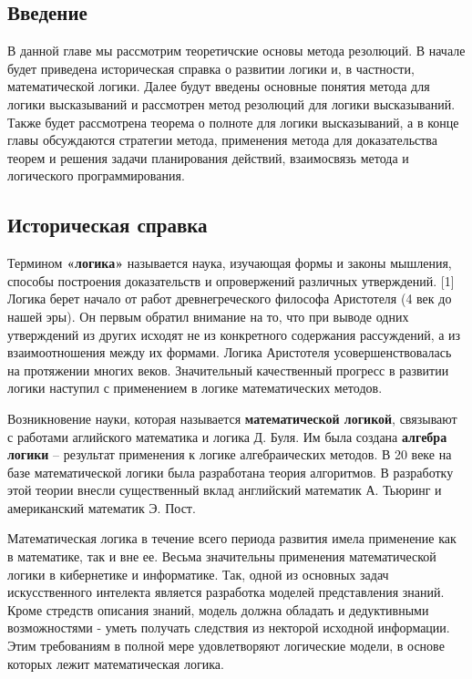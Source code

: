 \documentclass[12pt, a4paper]{article}
\begin{document}
	\setcounter{section}{1}
	
	\begin{center}
		\subsection{Введение}
	\end{center} 
	\par В данной главе мы рассмотрим теоретичские основы метода резолюций. В начале будет приведена историческая справка о развитии логики и, в частности, математической логики. Далее будут введены основные понятия метода для логики высказываний и рассмотрен метод резолюций для логики высказываний. Также будет рассмотрена теорема о полноте для логики высказываний, а в конце главы обсуждаются стратегии метода, применения метода для доказательства теорем и решения задачи планирования действий, взаимосвязь метода и логического программирования.
	
	\begin{center}
		\subsection{Историческая справка}
	\end{center} 
	 \par Термином \textbf{«логика» }называется наука, изучающая формы и законы мышления, способы построения доказательств и опровержений различных утверждений. [1] Логика берет начало от работ древнегреческого философа Аристотеля (4 век до нашей эры). Он первым обратил внимание на то, что при выводе одних утверждений из других исходят не из конкретного содержания рассуждений, а из взаимоотношения между их формами. Логика Аристотеля усовершенствовалась на протяжении многих веков. Значительный качественный прогресс в развитии логики наступил с применением в логике математических методов.
	 \par Возникновение науки, которая называется \textbf{математической логикой}, связывают с работами аглийского математика и логика Д. Буля. Им была создана \textbf{алгебра логики} – результат применения к логике алгебраических методов. В 20 веке на базе математической логики была разработана теория алгоритмов. В разработку этой теории внесли существенный вклад английский математик А. Тьюринг и американский математик Э. Пост. 
	 \par Математическая логика в течение всего периода развития имела применение как в математике, так и вне ее. Весьма значительны применения математической логики в кибернетике и информатике. Так, одной из основных задач искусственного интелекта является разработка моделей представления знаний. Кроме стредств описания знаний, модель должна обладать и дедуктивными возможностями - уметь получать следствия из некторой исходной информации. Этим требованиям в полной мере удовлетворяют логические модели, в основе которых лежит математическая логика.
	 
\end{document}
